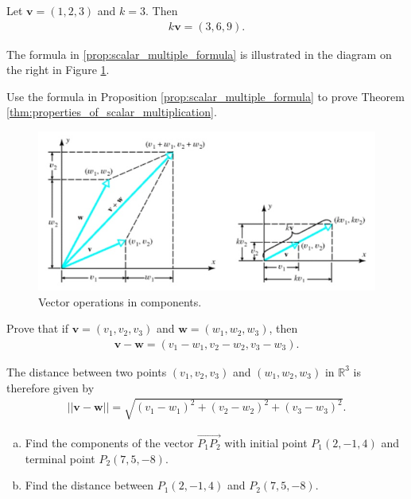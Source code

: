 \documentclass[12pt,letterpaper,reqno]{article}
\numberwithin{equation}{section}
\begin{document}
\begin{example}
Let $\mathbf{v}=(1,2,3)$ and $k=3$. Then
\begin{align*}
	k\mathbf{v}=(3,6,9).
\end{align*}	
\end{example}

The formula in \eqref{prop:scalar_multiple_formula} is illustrated in the diagram on the right in Figure \ref{fig:vector_operations}.


\begin{exercise}
Use the formula in Proposition \eqref{prop:scalar_multiple_formula} to prove Theorem \eqref{thm:properties_of_scalar_multiplication}.	
\end{exercise}

\begin{figure}\label{fig:vector_operations}
	\begin{center}
	\includegraphics[scale=0.5]{figures_mvc/vector_operations}
\end{center}	
\caption{Vector operations in components.}
\end{figure}

\begin{exercise}
Prove that if $\mathbf{v}=(v_1,v_2,v_3)$ and $\mathbf{w}=(w_1,w_2,w_3)$, then
\begin{align*}
	\mathbf{v}-\mathbf{w}=(v_1-w_1,v_2-w_2,v_3-w_3).
\end{align*}	
\end{exercise}

 The distance between two points $(v_1,v_2,v_3)$ and $(w_1,w_2,w_3)$ in $\mathbb{R}^3$ is therefore given by
\begin{align*}
	||\mathbf{v}-\mathbf{w}||=\sqrt{(v_1-w_1)^2+(v_2-w_2)^2+(v_3-w_3)^2}.
\end{align*}

\begin{example}
\begin{enumerate}[(a)]
	\item Find the components of the vector $\overrightarrow{P_1P_2}$ with initial point $P_1(2,-1,4)$ and terminal point $P_2(7,5,-8)$.
	\item Find the distance between $P_1(2,-1,4)$ and $P_2(7,5,-8)$.
\end{enumerate}	
\end{example}
\end{document}
